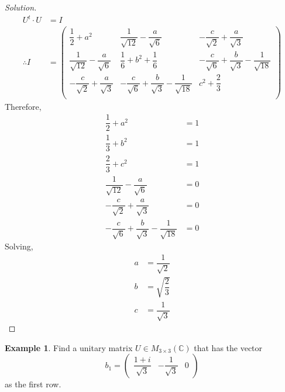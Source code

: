 \documentclass[fleqn, a4paper, 12pt]{article}
\theoremstyle{definition}
\newtheorem{example}{Example}
\theoremstyle{theorem}
\newenvironment{solution}
{\begin{proof}[Solution]\let\qed\relax}
	{\end{proof}}
\begin{document}
\begin{solution}
	\begin{align*}
		U^t \cdot U &= I\\
		\therefore I &=
			\begin{pmatrix}
				\dfrac{1}{2} + a^2 & \dfrac{1}{\sqrt{12}} - \dfrac{a}{\sqrt{6}} & -\dfrac{c}{\sqrt{2}} + \dfrac{a}{\sqrt{3}}\\
				\dfrac{1}{\sqrt{12}} - \dfrac{a}{\sqrt{6}} & \dfrac{1}{6} + b^2 + \dfrac{1}{6} & -\dfrac{c}{\sqrt{6}} + \dfrac{b}{\sqrt{3}} - \dfrac{1}{\sqrt{18}}\\
				-\dfrac{c}{\sqrt{2}} + \dfrac{a}{\sqrt{3}} & -\dfrac{c}{\sqrt{6}} + \dfrac{b}{\sqrt{3}} - \dfrac{1}{\sqrt{18}} & c^2 + \dfrac{2}{3}\\
			\end{pmatrix}
	\end{align*}
	Therefore,
	\begin{align*}
		\dfrac{1}{2} + a^2 &= 1\\
		\dfrac{1}{3} + b^2 &= 1\\
		\dfrac{2}{3} + c^2 &= 1\\
		\dfrac{1}{\sqrt{12}} - \dfrac{a}{\sqrt{6}} &= 0\\
		-\dfrac{c}{\sqrt{2}} + \dfrac{a}{\sqrt{3}} &= 0\\
		-\dfrac{c}{\sqrt{6}} + \dfrac{b}{\sqrt{3}} - \dfrac{1}{\sqrt{18}} &= 0
	\end{align*}
	Solving,
	\begin{align*}
		a &= \dfrac{1}{\sqrt{2}}\\
		b &= \sqrt{\dfrac{2}{3}}\\
		c &= \dfrac{1}{\sqrt{3}}
	\end{align*}
\end{solution}

\begin{example}
	Find a unitary matrix $U \in M_{3 \times 3}(\mathbb{C})$ that has the vector 
	\begin{equation*}
		b_1 = 
			\begin{pmatrix}
				\dfrac{1 + i}{\sqrt{3}} &  -\dfrac{1}{\sqrt{3}} & 0
			\end{pmatrix}
	\end{equation*}
	as the first row.
\end{example}
\end{document}
